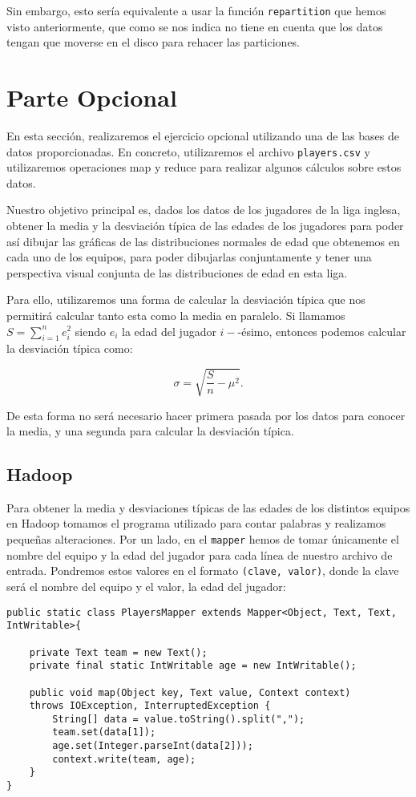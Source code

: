 \documentclass[11pt]{article}
\def\inline{\lstinline[basicstyle=\ttfamily,keywordstyle={}]}
\begin{document}
Sin embargo, esto sería equivalente a usar la función \inline{repartition} que hemos visto anteriormente, que como se nos indica no tiene en cuenta que los datos tengan que moverse en el disco para rehacer las particiones.

\section{Parte Opcional}

En esta sección, realizaremos el ejercicio opcional utilizando una de las bases de datos proporcionadas. En concreto, utilizaremos el archivo \inline{players.csv} y utilizaremos operaciones map y reduce para realizar algunos cálculos sobre estos datos.

Nuestro objetivo principal es, dados los datos de los jugadores de la liga inglesa, obtener la media y la desviación típica de las edades de los jugadores para poder así dibujar las gráficas de las distribuciones normales de edad que obtenemos en cada uno de los equipos, para poder dibujarlas conjuntamente y tener una perspectiva visual conjunta de las distribuciones de edad en esta liga.

Para ello, utilizaremos una forma de calcular la desviación típica que nos permitirá calcular tanto esta como la media en paralelo. Si llamamos $S = \sum_{i=1}^n e_i^2$ siendo $e_i$ la edad del jugador $i-$-ésimo, entonces podemos calcular la desviación típica como:

\[
\sigma = \sqrt{\frac{S}{n} - \mu^2}.
\]

De esta forma no será necesario hacer primera pasada por los datos para conocer la media, y una segunda para calcular la desviación típica.

\subsection{Hadoop}

Para obtener la media y desviaciones típicas de las edades de los distintos equipos en Hadoop tomamos el programa utilizado para contar palabras y realizamos pequeñas alteraciones. Por un lado, en el \inline{mapper} hemos de tomar únicamente el nombre del equipo y la edad del jugador para cada línea de nuestro archivo de entrada. Pondremos estos valores en el formato \inline{(clave, valor)}, donde la clave será el nombre del equipo y el valor, la edad del jugador:

\begin{verbatim}
public static class PlayersMapper extends Mapper<Object, Text, Text, IntWritable>{
	
	private Text team = new Text();
	private final static IntWritable age = new IntWritable();
	
	public void map(Object key, Text value, Context context)
	throws IOException, InterruptedException {
		String[] data = value.toString().split(",");
		team.set(data[1]);
		age.set(Integer.parseInt(data[2]));
		context.write(team, age);
	}
}
\end{verbatim}
\end{document}
